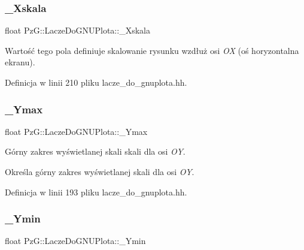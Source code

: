 \subsubsection{\texorpdfstring{\+\_\+\+Xskala}{\_Xskala}}
{\footnotesize\ttfamily float Pz\+G\+::\+Lacze\+Do\+G\+N\+U\+Plota\+::\+\_\+\+Xskala\hspace{0.3cm}{\ttfamily [protected]}}

Wartość tego pola definiuje skalowanie rysunku wzdłuż osi {\itshape OX} (oś horyzontalna ekranu). 

Definicja w linii 210 pliku lacze\+\_\+do\+\_\+gnuplota.\+hh.

\mbox{\label{class_pz_g_1_1_lacze_do_g_n_u_plota_ad7dfd3fad82ea0720ec89eacc18410bf}} 
\subsubsection{\texorpdfstring{\+\_\+\+Ymax}{\_Ymax}}
{\footnotesize\ttfamily float Pz\+G\+::\+Lacze\+Do\+G\+N\+U\+Plota\+::\+\_\+\+Ymax\hspace{0.3cm}{\ttfamily [protected]}}



Górny zakres wyświetlanej skali skali dla osi {\itshape OY}. 

Określa górny zakres wyświetlanej skali dla osi {\itshape OY}. 

Definicja w linii 193 pliku lacze\+\_\+do\+\_\+gnuplota.\+hh.

\mbox{\label{class_pz_g_1_1_lacze_do_g_n_u_plota_abc555fd6b82b0d5c9efb4802b58dc317}} 
\subsubsection{\texorpdfstring{\+\_\+\+Ymin}{\_Ymin}}
{\footnotesize\ttfamily float Pz\+G\+::\+Lacze\+Do\+G\+N\+U\+Plota\+::\+\_\+\+Ymin\hspace{0.3cm}{\ttfamily [protected]}}



